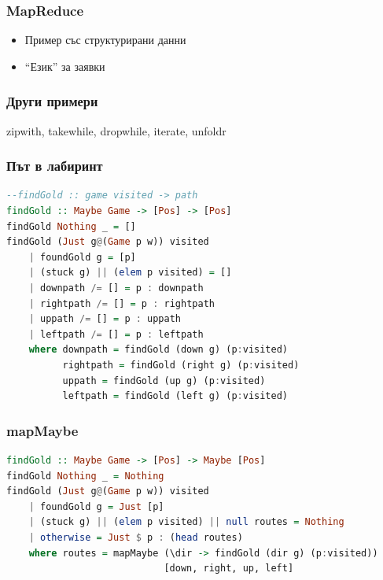\documentclass{beamer}
\begin{document}
\begin{frame}[fragile]
  \frametitle{MapReduce}



  \begin{itemize}
    \item Пример със структурирани данни
    \item ``Език'' за заявки
  \end{itemize}

\end{frame}


\begin{frame}[fragile]
  \frametitle{Други примери}

  zipwith, takewhile, dropwhile, iterate, unfoldr

\end{frame}


\begin{frame}[fragile]
  \frametitle{Път в лабиринт}

  \begin{lstlisting}[basicstyle=\tiny,language=Haskell]
--findGold :: game visited -> path
findGold :: Maybe Game -> [Pos] -> [Pos]
findGold Nothing _ = []
findGold (Just g@(Game p w)) visited
    | foundGold g = [p]
    | (stuck g) || (elem p visited) = []
    | downpath /= [] = p : downpath
    | rightpath /= [] = p : rightpath
    | uppath /= [] = p : uppath
    | leftpath /= [] = p : leftpath
    where downpath = findGold (down g) (p:visited)
          rightpath = findGold (right g) (p:visited)
          uppath = findGold (up g) (p:visited)
          leftpath = findGold (left g) (p:visited)  
  \end{lstlisting}
  
\end{frame}


\begin{frame}[fragile]
  \frametitle{mapMaybe}

\begin{lstlisting}[basicstyle=\tiny,language=Haskell]
findGold :: Maybe Game -> [Pos] -> Maybe [Pos]
findGold Nothing _ = Nothing
findGold (Just g@(Game p w)) visited
    | foundGold g = Just [p]
    | (stuck g) || (elem p visited) || null routes = Nothing
    | otherwise = Just $ p : (head routes)
    where routes = mapMaybe (\dir -> findGold (dir g) (p:visited))
                            [down, right, up, left]  
\end{lstlisting}
  
\end{frame}
\end{document}
